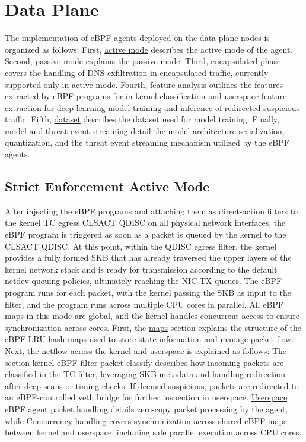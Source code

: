 \documentclass [11pt, proquest] {uwthesis}[2020/02/24]
\begin{document}
\section{Data Plane}
The implementation of eBPF agents deployed on the data plane nodes is organized as follows: First, \hyperref[sec:active]{active mode} describes the active mode of the agent. Second, \hyperref[sec:passive]{passive mode} explains the passive mode. Third, \hyperref[sec:encap]{encapsulated phase} covers the handling of DNS exfiltration in encapsulated traffic, currently supported only in active mode. Fourth, \hyperref[sec:feature]{feature analysis} outlines the features extracted by eBPF programs for in-kernel classification and userspace feature extraction for deep learning model training and inference of redirected suspicious traffic. Fifth, \hyperref[sec:dataset]{dataset} describes the dataset used for model training. Finally, \hyperref[sec:model]{model} and \hyperref[sec:threat-event-streaming]{threat event streaming} detail the model architecture serialization, quantization, and the threat event streaming mechanism utilized by the eBPF agents.

\subsection{Strict Enforcement Active Mode}
\label{sec:active}
After injecting the eBPF programs and attaching them as direct-action filters to the kernel TC egress CLSACT QDISC on all physical network interfaces, the eBPF program is triggered as soon as a packet is queued by the kernel to the CLSACT QDISC. At this point, within the QDISC egress filter, the kernel provides a fully formed SKB that has already traversed the upper layers of the kernel network stack and is ready for transmission according to the default netdev queuing policies, ultimately reaching the NIC TX queues. The eBPF program runs for each packet, with the kernel passing the SKB as input to the filter, and the program runs across multiple CPU cores in parallel. All eBPF maps in this mode are global, and the kernel handles concurrent access to ensure synchronization across cores. First, the \hyperref[sec:dp_eBPF_LRU_Maps_active]{maps} section explains the structure of the eBPF LRU hash maps used to store state information and manage packet flow. Next, the netflow across the kernel and userspace is explained as follows:
The section \hyperref[active:sec1]{kernel eBPF filter packet classify} describes how incoming packets are classified in the TC filter, leveraging SKB metadata and handling redirection after deep scans or timing checks. If deemed suspicious, packets are redirected to an eBPF-controlled veth bridge for further inspection in userspace. \hyperref[active:sec3]{Userspace eBPF agent packet handling} details zero-copy packet processing by the agent, while \hyperref[active:sec3]{Concurrency handling} covers synchronization across shared eBPF maps between kernel and userspace, including safe parallel execution across CPU cores.
\end{document}
